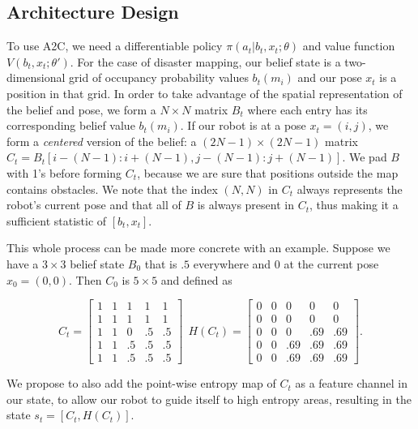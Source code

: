 \documentclass{article}
\begin{document}
\subsection{Architecture Design}

To use A2C, we need a differentiable policy $\pi(a_t|b_t, x_t; \theta)$ and value function $V(b_t, x_t; \theta')$. For the case of disaster mapping, our belief state is a two-dimensional grid of occupancy probability values $b_t(m_i)$ and our pose $x_t$ is a position in that grid. In order to take advantage of the spatial representation of the belief and pose, we form a $N \times N$ matrix $B_t$ where each entry has its corresponding belief value $b_t(m_i)$. If our robot is at a pose $x_t=(i, j)$, we form a \emph{centered} version of the belief: a $(2N-1) \times (2N-1)$ matrix $C_t=B_t[i-(N-1):i+(N-1), j-(N-1):j+(N-1)]$. We pad $B$ with 1's before forming $C_t$, because we are sure that positions outside the map contains obstacles. We note that the index $(N, N)$ in $C_t$ always represents the robot's current pose and that all of $B$ is always present in $C_t$, thus making it a sufficient statistic of $[b_t, x_t]$.

This whole process can be made more concrete with an example. Suppose we have a $3 \times 3$ belief state $B_0$ that is $.5$ everywhere and $0$ at the current pose $x_0=(0, 0)$. Then $C_0$ is $5 \times 5$ and defined as

$$C_t =
\begin{bmatrix}
    1       & 1 & 1 & 1 & 1 \\
    1       & 1 & 1 & 1 & 1 \\
    1       & 1 & 0 & .5 & .5 \\
    1       & 1 & .5 & .5 & .5 \\
    1       & 1 & .5 & .5 & .5
\end{bmatrix} \ \
H(C_t) =
\begin{bmatrix}
    0       & 0 & 0 & 0 & 0 \\
    0       & 0 & 0 & 0 & 0 \\
    0       & 0 & 0 & .69 & .69 \\
    0       & 0 & .69 & .69 & .69 \\
    0       & 0 & .69 & .69 & .69
\end{bmatrix}
.$$

We propose to also add the point-wise entropy map of $C_t$ as a feature channel in our state, to allow our robot to guide itself to high entropy areas, resulting in the state $s_t=[C_t, H(C_t)]$.
\end{document}
